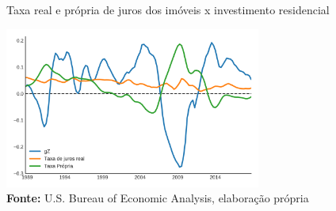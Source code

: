 
 
\begin{figure}[H]
	\centering
	\caption{Taxa real e própria de juros dos imóveis x investimento residencial}
	\label{gZ_Propria}
	\includegraphics[width=0.75\textwidth]{Fatos_Estilizados/Figs/TxPropria_Investo.png}
	\caption*{\textbf{Fonte:} U.S. Bureau of Economic Analysis, elaboração própria}
\end{figure}
